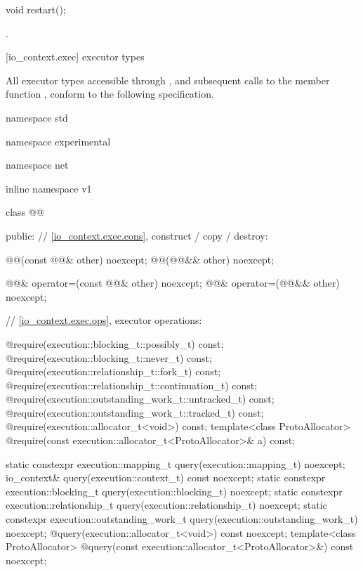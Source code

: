 %
\begin{itemdecl}
void restart();
\end{itemdecl}

\begin{itemdescr}
\pnum
\postconditions {}.
\end{itemdescr}




[io_context.exec]{ executor types}

\pnum
All executor types accessible through , and subsequent calls to the member function , conform to the following specification.

%
\begin{codeblock}
namespace std {
namespace experimental {
namespace net {
inline namespace v1 {

  class @@
  {
  public:
    // \ref{io_context.exec.cons}, construct / copy / destroy:

    @@(const @@& other) noexcept;
    @@(@@&& other) noexcept;

    @@& operator=(const @@& other) noexcept;
    @@& operator=(@@&& other) noexcept;

    // \ref{io_context.exec.ops}, executor operations:

    @\seebelow@ require(execution::blocking_t::possibly_t) const;
    @\seebelow@ require(execution::blocking_t::never_t) const;
    @\seebelow@ require(execution::relationship_t::fork_t) const;
    @\seebelow@ require(execution::relationship_t::continuation_t) const;
    @\seebelow@ require(execution::outstanding_work_t::untracked_t) const;
    @\seebelow@ require(execution::outstanding_work_t::tracked_t) const;
    @\seebelow@ require(execution::allocator_t<void>) const;
    template<class ProtoAllocator>
      @\seebelow@ require(const execution::allocator_t<ProtoAllocator>& a) const;

    static constexpr execution::mapping_t query(execution::mapping_t) noexcept;
    io_context& query(execution::context_t) const noexcept;
    static constexpr execution::blocking_t query(execution::blocking_t) noexcept;
    static constexpr execution::relationship_t query(execution::relationship_t) noexcept;
    static constexpr execution::outstanding_work_t query(execution::outstanding_work_t) noexcept;
    @\seebelow@ query(execution::allocator_t<void>) const noexcept;
    template<class ProtoAllocator>
      @\seebelow@ query(const execution::allocator_t<ProtoAllocator>&) const noexcept;

}}}}}
\end{codeblock}
